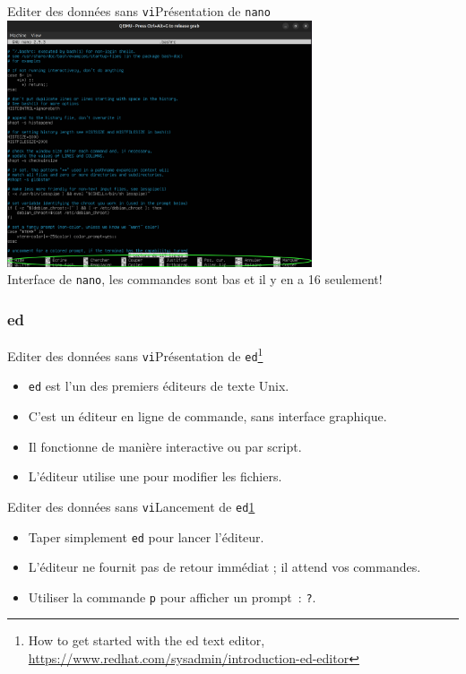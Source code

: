 \documentclass{beamer}
\begin{document}
    \begin{frame}{Editer des données sans \lstinline{vi}Présentation de \lstinline{nano}}
        \centering
        \includegraphics[width=9cm]{image/nano-screen.drawio} \\ Interface de \lstinline{nano}, les commandes sont bas et il y en a 16 seulement! \\
    \end{frame}

    \subsubsection{ed}\label{subsubsec:ed}
    \begin{frame}{Editer des données sans \lstinline{vi}}{Présentation de \lstinline{ed}\footnote{\label{redhated}How to get started with the ed text editor, \url{https://www.redhat.com/sysadmin/introduction-ed-editor}}}
        \begin{itemize}
            \item \lstinline{ed} est l'un des premiers éditeurs de texte Unix.
            \item C'est un éditeur en ligne de commande, sans interface graphique.
            \item Il fonctionne de manière interactive ou par script.
            \item L'éditeur utilise une  pour modifier les fichiers.
        \end{itemize}
    \end{frame}

    \begin{frame}{Editer des données sans \lstinline{vi}}{Lancement de \lstinline{ed}\cref{redhated}}
        \begin{itemize}
            \item Taper simplement \lstinline{ed} pour lancer l'éditeur.
            \item L'éditeur ne fournit pas de retour immédiat ; il attend vos commandes.
            \item Utiliser la commande \lstinline{p} pour afficher un prompt~: \lstinline{?}.
        \end{itemize}
    \end{frame}
\end{document}

